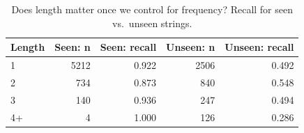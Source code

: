 \begin{table}[t]
\centering
\small
\caption{Does length matter once we control for frequency? Recall for seen vs.\ unseen strings.}
\label{tab:lenseen}
\begin{tabular}{lrrrr}
\toprule
Length & Seen: n & Seen: recall & Unseen: n & Unseen: recall \\
\midrule
1 & 5212 & 0.922 & 2506 & 0.492 \\
2 & 734 & 0.873 & 840 & 0.548 \\
3 & 140 & 0.936 & 247 & 0.494 \\
4+ & 4 & 1.000 & 126 & 0.286 \\
\bottomrule
\end{tabular}
\end{table}
